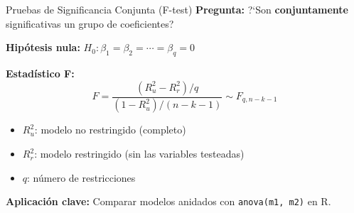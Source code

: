 \documentclass[aspectratio=169,11pt]{beamer}
\begin{document}
\begin{frame}{Pruebas de Significancia Conjunta (F-test)}
\small
\textbf{Pregunta:} ?`Son \textbf{conjuntamente} significativas un grupo de coeficientes?

\vspace{0.2cm}

\textbf{Hip\'otesis nula:} $H_0: \beta_1 = \beta_2 = \cdots = \beta_q = 0$

\vspace{0.2cm}

\textbf{Estad\'istico F:}
\[
F = \frac{(R^2_u - R^2_r) / q}{(1 - R^2_u) / (n - k - 1)} \sim F_{q, n-k-1}
\]

\vspace{0.2cm}

\begin{itemize}
    \setlength{\itemsep}{2pt}
    \item $R^2_u$: modelo no restringido (completo)
    \item $R^2_r$: modelo restringido (sin las variables testeadas)
    \item $q$: n\'umero de restricciones
\end{itemize}

\vspace{0.2cm}

\textbf{Aplicaci\'on clave:} Comparar modelos anidados con \texttt{anova(m1, m2)} en R.
\end{frame}
\end{document}
